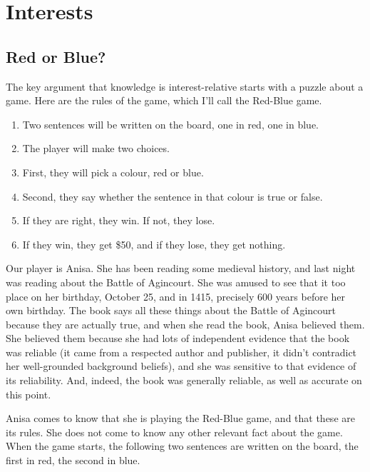 \documentclass[
  11pt,
]{book}
\providecommand{\tightlist}{%
  \setlength{\itemsep}{0pt}\setlength{\parskip}{0pt}}
\begin{document}
\hypertarget{interests}{%
\chapter{Interests}\label{interests}}

\hypertarget{redblue}{%
\section{Red or Blue?}\label{redblue}}

The key argument that knowledge is interest-relative starts with a puzzle about a game. Here are the rules of the game, which I'll call the Red-Blue game.

\begin{enumerate}
\def\labelenumi{\arabic{enumi}.}
\tightlist
\item
  Two sentences will be written on the board, one in red, one in blue.
\item
  The player will make two choices.
\item
  First, they will pick a colour, red or blue.
\item
  Second, they say whether the sentence in that colour is true or
  false.
\item
  If they are right, they win. If not, they lose.
\item
  If they win, they get \$50, and if they lose, they get nothing.
\end{enumerate}

Our player is Anisa. She has been reading some medieval history, and last night was reading about the Battle of Agincourt. She was amused to see that it too place on her birthday, October 25, and in 1415, precisely 600 years before her own birthday. The book says all these things about the Battle of Agincourt because they are actually true, and when she read the book, Anisa believed them. She believed them because she had lots of independent evidence that the book was reliable (it came from a respected author and publisher, it didn't contradict her well-grounded background beliefs), and she was sensitive to that evidence of its reliability. And, indeed, the book was generally reliable, as well as accurate on this point.

Anisa comes to know that she is playing the Red-Blue game, and that these are its rules. She does not come to know any other relevant fact about the game. When the game starts, the following two sentences are written on the board, the first in red, the second in blue.
\end{document}
